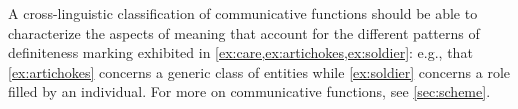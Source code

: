 \documentclass[11pt,letterpaper]{article}
\begin{document}
\begin{small}
\end{small}
A cross-linguistic classification of communicative functions  
should be able to characterize the aspects of meaning that account for the different patterns of definiteness marking 
exhibited in \cref{ex:care,ex:artichokes,ex:soldier}: e.g., that \cref{ex:artichokes} concerns a generic class of entities while 
\cref{ex:soldier} concerns a role filled by an individual. For more on communicative functions, see \cref{sec:scheme}.
\end{document}
